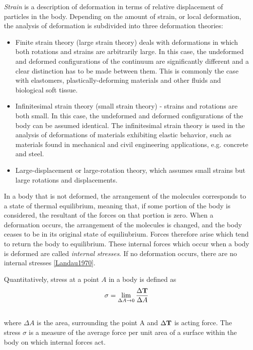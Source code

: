 \documentclass[letterpaper,10pt,english]{sphinxmanual}
\begin{document}
\emph{Strain} is a description of deformation in terms of relative displacement of particles in the body. Depending on the amount of strain, or local deformation, the analysis of deformation is subdivided into three deformation theories:
\begin{itemize}
\item {} 
Finite strain theory (large strain theory) deals with deformations in which both rotations and strains are arbitrarily large. In this case, the undeformed and deformed configurations of the continuum are significantly different and a clear distinction has to be made between them. This is commonly the case with elastomers, plastically-deforming materials and other fluids and biological soft tissue.

\item {} 
Infinitesimal strain theory (small strain theory) - strains and rotations are both small. In this case, the undeformed and deformed configurations of the body can be assumed identical. The infinitesimal strain theory is used in the analysis of deformations of materials exhibiting elastic behavior, such as materials found in mechanical and civil engineering applications, e.g. concrete and steel.

\item {} 
Large-displacement or large-rotation theory, which assumes small strains but large rotations and displacements.

\end{itemize}

In a body that is not deformed, the arrangement of the molecules corresponds to a state of thermal equilibrium, meaning that, if some portion of the body is considered, the resultant of the forces on that portion is zero. When a deformation occurs, the arrangement of the molecules is changed, and the body ceases to be in its original state of equiliubrium. Forces therefore arise which tend to return the body to equilibrium. These internal forces which occur when a body is deformed are called \emph{internal stresses}. If no deformation occurs, there are no internal stresses {\hyperref[general:landau1970]{{[}Landau1970{]}}}.

Quantitatively, stress at a point $A$ in a body is defined as
\label{general:equation-eqstress2}\begin{gather}
\begin{split}\sigma = \lim_{\Delta A \to 0}\frac{\Delta {\bf T}}{\Delta A}\end{split}\label{general-eqstress2}\\\begin{split}\end{split}\notag
\end{gather}
where $\Delta A$ is the area, surrounding the point A and $\Delta {\bf T}$ is acting force. The stress $\sigma$ is a measure of the average force per unit area of a surface within the body on which internal forces act.
\end{document}
